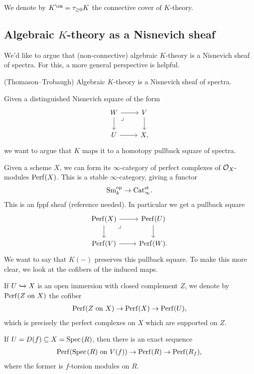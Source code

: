 \documentclass[11pt,openany]{book}
\begin{document}
\begin{notation} We denote by $K^\cn = \tau_{\ge 0} K$ the connective cover of $K$-theory.
\end{notation}

\subsection{Algebraic $K$-theory as a Nisnevich sheaf}

We'd like to argue that (non-connective) algebraic $K$-theory is a Nisnevich sheaf of spectra. For this, a more general perspective is helpful.

\begin{theorem} (Thomason--Trobaugh) Algebraic $K$-theory is a Nisnevich sheaf of spectra.
\end{theorem}

Given a distinguished Nisnevich square of the form
\[ \begin{tikzcd}
    W\rar\dar\pb & V\dar\\
    U\rar & X,
\end{tikzcd} \]
we want to argue that $K$ maps it to a homotopy pullback square of spectra.

Given a scheme $X$, we can form its $\infty$-category of perfect complexes of $\mathcal{O}_X$-modules $\mathrm{Perf}(X)$. This is a stable $\infty$-category, giving a functor
\begin{align*}
    \mathrm{Sm}_k^{\mathrm{op}} \to \mathrm{Cat}_\infty^{\mathrm{st}}.
\end{align*}
%
This is an fppf sheaf (reference needed). In particular we get a pullback square
\[ \begin{tikzcd}
    \Perf(X)\rar\dar\pb & \Perf(U)\dar\\
    \Perf(V)\rar & \Perf(W).
\end{tikzcd} \]
We want to say that $K(-)$ preserves this pullback square. To make this more clear, we look at the cofibers of the induced maps.

\begin{notation} If $U \xhookrightarrow{} X$ is an open immersion with closed complement $Z$, we denote by $\mathrm{Perf}(Z\text{ on }X)$ the cofiber
\begin{align*}
    \mathrm{Perf}(Z\text{ on }X) \to \mathrm{Perf}(X) \to \mathrm{Perf}(U),
\end{align*}
which is precisely the perfect complexes on $X$ which are supported on $Z$.
\end{notation}

\begin{example} If $U = D(f) \subseteq X = \text{Spec}\hspace{0.1em}(R)$, then there is an exact sequence
\begin{align*}
    \mathrm{Perf}(\text{Spec}\hspace{0.1em}(R) \text{ on } V(f)) \to \mathrm{Perf}(R) \to \mathrm{Perf}(R_f),
\end{align*}
where the former is $f$-torsion modules on $R$.
\end{example}
\end{document}
